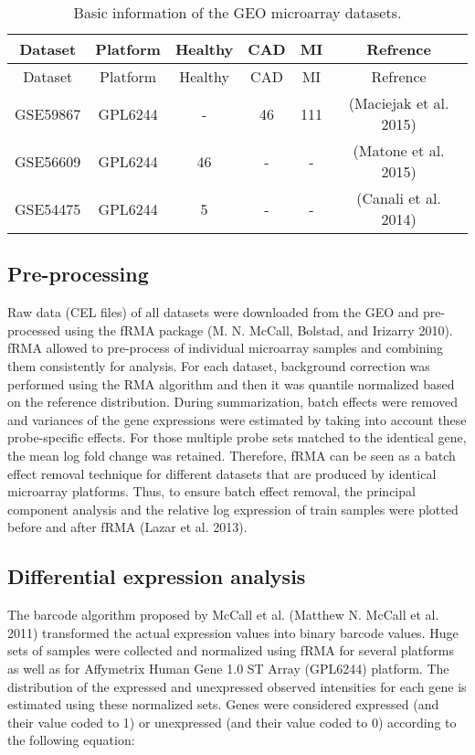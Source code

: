 \documentclass[smallextended]{svjour3}       %
\begin{document}
\begin{longtable}[]{@{}cccccc@{}}
\caption{Basic information of the GEO microarray
datasets.}\tabularnewline
\toprule()
Dataset & Platform & Healthy & CAD & MI & Refrence \\
\midrule()
\endfirsthead
\toprule()
Dataset & Platform & Healthy & CAD & MI & Refrence \\
\midrule()
\endhead
GSE59867 & GPL6244 & - & 46 & 111 & (Maciejak et al. 2015) \\
GSE56609 & GPL6244 & 46 & - & - & (Matone et al. 2015) \\
GSE54475 & GPL6244 & 5 & - & - & (Canali et al. 2014) \\
\bottomrule()
\end{longtable}

\hypertarget{pre-processing}{%
\subsection{Pre-processing}\label{pre-processing}}

Raw data (CEL files) of all datasets were downloaded from the GEO and
pre-processed using the fRMA package (M. N. McCall, Bolstad, and
Irizarry 2010). fRMA allowed to pre-process of individual microarray
samples and combining them consistently for analysis. For each dataset,
background correction was performed using the RMA algorithm and then it
was quantile normalized based on the reference distribution. During
summarization, batch effects were removed and variances of the gene
expressions were estimated by taking into account these probe-specific
effects. For those multiple probe sets matched to the identical gene,
the mean log fold change was retained. Therefore, fRMA can be seen as a
batch effect removal technique for different datasets that are produced
by identical microarray platforms. Thus, to ensure batch effect removal,
the principal component analysis and the relative log expression of
train samples were plotted before and after fRMA (Lazar et al. 2013).

\hypertarget{differential-expression-analysis}{%
\subsection{Differential expression
analysis}\label{differential-expression-analysis}}

The barcode algorithm proposed by McCall et al. (Matthew N. McCall et
al. 2011) transformed the actual expression values into binary barcode
values. Huge sets of samples were collected and normalized using fRMA
for several platforms as well as for Affymetrix Human Gene 1.0 ST Array
(GPL6244) platform. The distribution of the expressed and unexpressed
observed intensities for each gene is estimated using these normalized
sets. Genes were considered expressed (and their value coded to 1) or
unexpressed (and their value coded to 0) according to the following
equation:
\end{document}
